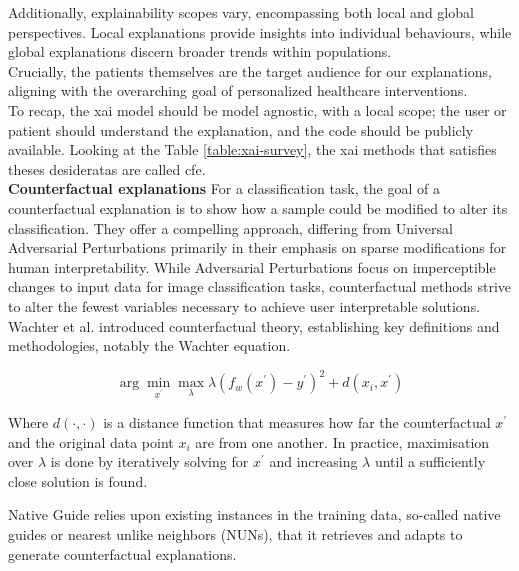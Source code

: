 Additionally, explainability scopes vary, encompassing both local and global perspectives.
Local explanations provide insights into individual behaviours, while global explanations discern broader trends within populations. \\

Crucially, the patients themselves are the target audience for our explanations, aligning with the overarching goal of personalized healthcare interventions.\\



To recap, the \acrshort{xai} model should be model agnostic, with a local scope; the user or patient should understand the explanation, and the code should be publicly available.
Looking at the Table \ref{table:xai-survey}, the \acrshort{xai} methods that satisfies theses desideratas are called \acrfull{cfe}.\\

\textbf{Counterfactual explanations} For a classification task, the goal of a counterfactual explanation is to show how a sample could be modified to alter its classification. They offer a compelling approach, differing from Universal Adversarial Perturbations \cite{moosavi_dezfooli_universal_2017} primarily in their emphasis on sparse modifications for human interpretability.
While Adversarial Perturbations focus on imperceptible changes to input data for image classification tasks, counterfactual methods strive to alter the fewest variables necessary to achieve user interpretable solutions. \\


Wachter et al. \cite{wachter_counterfactual_2018} introduced counterfactual theory, establishing key definitions and methodologies, notably the Wachter equation. 

\begin{equation} \label{eq:2}
\arg \min _{x^{\prime}} \max _{\lambda} \lambda\left(f_{w}\left(x^{\prime}\right)-y^{\prime}\right)^{2}+d\left(x_{i}, x^{\prime}\right)
\end{equation}

Where $d(\cdot, \cdot)$ is a distance function that measures how far the counterfactual $x^{\prime}$ and the original data point $x_{i}$ are from one another. In practice, maximisation over $\lambda$ is done by iteratively solving for $x^{\prime}$ and increasing $\lambda$ until a sufficiently close solution is found.


Native Guide \cite{delaney_instance-based_2021} relies upon existing instances in the training data, so-called native guides or nearest unlike neighbors (NUNs), that it retrieves and adapts to generate counterfactual explanations. 


